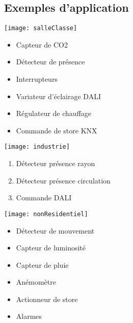 \subsection{Exemples d'application}
\begin{UPSTIactivite}
	\begin{center}
		\texttt{[image: salleClasse]}
	\end{center}
    \begin{multicols}{3}
		\begin{itemize}[label=\dots]
			\item Capteur de CO2
			\item Détecteur de présence
			\item Interrupteurs
			\item Variateur d'éclairage DALI
			\item Régulateur de chauffage
			\item Commande de store KNX
		\end{itemize}
	\end{multicols}
\end{UPSTIactivite}

\begin{UPSTIactivite}
	\begin{center}
		\texttt{[image: industrie]}
	\end{center}
    \begin{multicols}{3}
		\begin{enumerate}
			\item Détecteur présence rayon
			\item Détecteur présence circulation
			\item Commande DALI
		\end{enumerate}
	\end{multicols}
\end{UPSTIactivite}

\begin{UPSTIactivite}
	\begin{center}
		\texttt{[image: nonResidentiel]}
	\end{center}
    \begin{multicols}{3}
		\begin{itemize}
			\item Détecteur de mouvement
			\item Capteur de luminosité
			\item Capteur de pluie
			\item Anémomètre
			\item Actionneur de store
			\item Alarmes
		\end{itemize}
	\end{multicols}
\end{UPSTIactivite}

